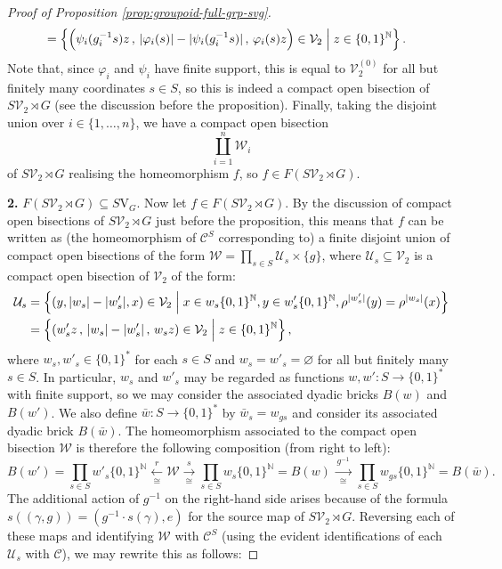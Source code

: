 \documentclass[10pt,a4paper]{amsart}
\numberwithin{equation}{section}
\numberwithin{figure}{section}
\theoremstyle{definition}
\newcommand{\cC}{\mathcal{C}}
\newcommand{\cU}{\mathcal{U}}
\newcommand{\cV}{\mathcal{V}}
\newcommand{\cW}{\mathcal{W}}
\newcommand{\bN}{\mathbb{N}}
\begin{document}
\begin{proof}[Proof of Proposition \ref{prop:groupoid-full-grp-svg}]
\begin{align*}
&= \left\lbrace \Bigl( \psi_i(g_i^{-1}s)z \, , \, \lvert \varphi_i(s) \rvert - \lvert \psi_i(g_i^{-1}s) \rvert \, , \, \varphi_i(s)z \Bigr) \in \cV_2 \Bigm| z \in \{0,1\}^\bN \right\rbrace .
\end{align*}
Note that, since $\varphi_i$ and $\psi_i$ have finite support, this is equal to $\cV_2^{(0)}$ for all but finitely many coordinates $s \in S$, so this is indeed a compact open bisection of $S\cV_2 \rtimes G$ (see the discussion before the proposition). Finally, taking the disjoint union over $i \in \{1,\ldots,n\}$, we have a compact open bisection
\[
\coprod_{i=1}^n \cW_i
\]
of $S\cV_2 \rtimes G$ realising the homeomorphism $f$, so $f \in F(S\mathcal{V}_2 \rtimes G)$.

\textbf{2.} $F(S\mathcal{V}_2 \rtimes {G}) \subseteq S\mathrm{V}_G$.
Now let $f \in F(S\mathcal{V}_2 \rtimes {G})$. By the discussion of compact open bisections of $S\cV_2 \rtimes G$ just before the proposition, this means that $f$ can be written as (the homeomorphism of $\cC^S$ corresponding to) a finite disjoint union of compact open bisections of the form $\cW = \prod_{s \in S} \cU_s \times \{g\}$, where $\cU_{s} \subseteq \cV_2$ is a compact open bisection of $\cV_2$ of the form:
\begin{align*}
\cU_s &= \left\lbrace (y, \lvert w_s \rvert - \lvert w'_s \rvert ,x) \in \cV_2 \Bigm| x\in w_s \{0,1\}^\bN, y\in w'_s \{0,1\}^\bN, \rho^{\lvert w'_s \rvert} (y) = \rho^{\lvert w_s \rvert}(x) \right\rbrace \\
&= \left\lbrace (w'_s z \, , \, \lvert w_s \rvert - \lvert w'_s \rvert \, , \, w_s z) \in \cV_2 \Bigm| z \in \{0,1\}^\bN \right\rbrace ,
\end{align*}
where $w_s, w'_s\in \{0,1\}^\ast$ for each $s\in S$ and $w_s = w'_s = \varnothing$ for all but finitely many $s\in S$. In particular, $w_s$ and $w'_s$ may be regarded as functions $w,w' \colon S \to \{0,1\}^\ast$ with finite support, so we may consider the associated dyadic bricks $B(w)$ and $B(w')$. We also define $\bar{w} \colon S \to \{0,1\}^{\ast}$ by $\bar{w}_s = w_{gs}$ and consider its associated dyadic brick $B(\bar{w})$. The homeomorphism associated to the compact open bisection $\cW$ is therefore the following composition (from right to left):
\[
B(w') = \prod_{s \in S} w'_s\{0,1\}^\bN \xleftarrow[\cong]{\; r \;} \cW \xrightarrow[\cong]{\; s \;} \prod_{s \in S} w_s\{0,1\}^\bN = B(w) \xrightarrow[\cong]{\; g^{-1} \;} \prod_{s \in S} w_{gs}\{0,1\}^\bN = B(\bar{w}).
\]
The additional action of $g^{-1}$ on the right-hand side arises because of the formula $s((\gamma,g)) = (g^{-1} \cdot s(\gamma),e)$ for the source map of $S\cV_2 \rtimes G$. Reversing each of these maps and identifying $\cW$ with $\cC^S$ (using the evident identifications of each $\cU_s$ with $\cC$), we may rewrite this as follows:

\end{proof}
\end{document}

